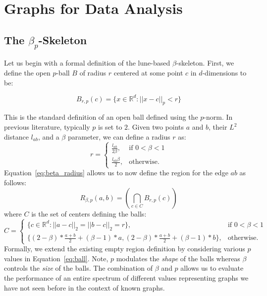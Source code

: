 
\chapter{Graphs for Data Analysis}
\label{ch:graphs}


\section{The $\beta_p$-Skeleton}
\label{sec:bpskeleton}
Let us begin with a formal definition of the lune-based $\beta$-skeleton.
%
First, we define the open $p$-ball $B$ of radius $r$ centered at some point $c$ in $d$-dimensions to be:

\begin{equation}
\label{eq:ball}
    B_{r,p}(c) = \{x \in \mathbb{R}^d : || x  - c ||_p < r\}
\end{equation}

This is the standard definition of an open ball defined using the $p$-norm.
%
In previous literature, typically $p$ is set to $2$.
%
Given two points $a$ and $b$, their $L^2$ distance $l_{ab}$, and a $\beta$ parameter, we can define a radius $r$ as:
%
\begin{equation}
    \label{eq:beta_radius}
    r =
    \begin{cases}
        \frac{l_{ab}}{2\beta}, & \text{if $0 < \beta < 1$}\\
        \frac{l_{ab}\beta}{2}, & \text{otherwise}.
    \end{cases}
\end{equation}
%
Equation~\ref{eq:beta_radius} allows us to now define the region for the edge $ab$ as follows:
%
\begin{equation}
    R_{\beta,p}(a,b) = \left(\bigcap_{c \in C} B_{r,p}(c)\right)
\end{equation}
%
where $C$ is the set of centers defining the balls:
%
\begin{equation}
C =
\begin{cases}
    \{c \in \mathbb{R}^d: ||a -c||_2 = ||b - c||_2 = r\}, & \text{if $0 < \beta < 1$}\\
    \{(2-\beta)*\frac{a+b}{2} + (\beta-1)*a, (2-\beta)*\frac{a+b}{2} + (\beta-1)*b\}, & \text{otherwise}.
\end{cases}
\end{equation}
%
Formally, we extend the existing empty region definition by considering various $p$ values in Equation~\ref{eq:ball}.
%
Note, $p$ modulates the \emph{shape} of the balls whereas $\beta$ controls the \emph{size} of the balls.
%
The combination of $\beta$ and $p$ allows us to evaluate the performance of an entire spectrum of different values representing graphs we have not seen before in the context of known graphs.

